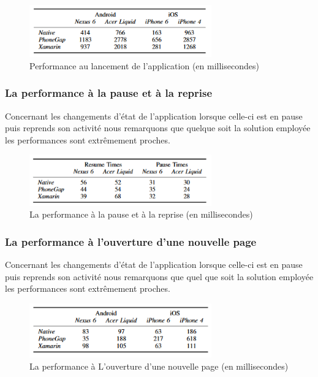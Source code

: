 \documentclass[11]{article}
\begin{document}
 \begin{figure}[h]
    \centering
    \includegraphics[width=0.7\textwidth]{a1}
    \caption{Performance au lancement de l’application (en millisecondes)
}
    \label{bat}
\end{figure}
 
    \subsubsection{La performance à la pause et à la reprise}
   
Concernant les changements d’état de l’application lorsque celle-ci est en pause puis reprends son activité nous remarquons que quelque soit la solution employée les performances sont extrêmement proches.

 \begin{figure}[h]
    \centering
    \includegraphics[width=0.7\textwidth]{a2}
    \caption{La performance à la pause et à la reprise (en millisecondes)}
    \label{bat}
\end{figure}
 
     \subsubsection{La performance à l’ouverture d’une nouvelle page}
   
Concernant les changements d’état de l’application lorsque celle-ci est en pause puis reprends son activité nous remarquons que quel que soit la solution employée les performances sont extrêmement proches.

 \begin{figure}[h]
    \centering
    \includegraphics[width=0.7\textwidth]{a3}
    \caption{La performance à L’ouverture d’une nouvelle page (en millisecondes)}
    \label{bat}
\end{figure}
 
\end{document}
